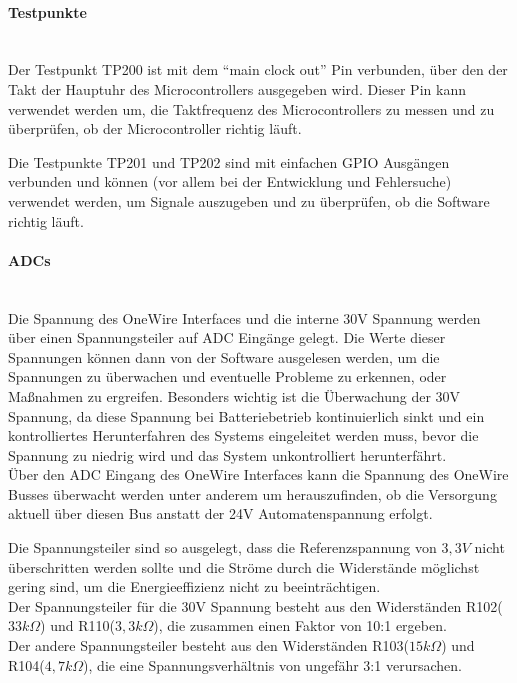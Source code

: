 \paragraph{Testpunkte}\mbox{}\\
Der Testpunkt TP200 ist mit dem \enquote{main clock out} Pin verbunden, über den der Takt der Hauptuhr des Microcontrollers
ausgegeben wird. Dieser Pin kann verwendet werden um, die Taktfrequenz des Microcontrollers zu messen und zu überprüfen, ob
der Microcontroller richtig läuft. 

Die Testpunkte TP201 und TP202 sind mit einfachen \ac{GPIO} Ausgängen verbunden und können (vor allem bei der Entwicklung und 
Fehlersuche) verwendet werden, um Signale auszugeben und zu überprüfen, ob die Software richtig läuft. 

\paragraph{\acp{ADC}}\mbox{}\\
Die Spannung des OneWire Interfaces und die interne 30V Spannung werden über einen Spannungsteiler auf \ac{ADC} Eingänge gelegt.
Die Werte dieser Spannungen können dann von der Software ausgelesen werden, um die Spannungen zu überwachen und eventuelle
Probleme zu erkennen, oder Maßnahmen zu ergreifen. Besonders wichtig ist die Überwachung der 30V Spannung, da diese 
Spannung bei Batteriebetrieb kontinuierlich sinkt und ein kontrolliertes Herunterfahren des Systems eingeleitet werden muss,
bevor die Spannung zu niedrig wird und das System unkontrolliert herunterfährt. \\
Über den \ac{ADC} Eingang des OneWire Interfaces kann die Spannung des OneWire Busses überwacht werden unter anderem um 
herauszufinden, ob die Versorgung aktuell über diesen Bus anstatt der 24V Automatenspannung erfolgt.

Die Spannungsteiler sind so ausgelegt, dass die Referenzspannung von \(3,3V\) nicht überschritten werden sollte und die 
Ströme durch die Widerstände möglichst gering sind, um die Energieeffizienz nicht zu beeinträchtigen. \\
Der Spannungsteiler für die 30V Spannung besteht aus den Widerständen R102(\(33k\Omega\)) und R110(\(3,3k\Omega\)), die 
zusammen einen Faktor von 10:1 ergeben. \\
Der andere Spannungsteiler besteht aus den Widerständen R103(\(15k\Omega\)) und R104(\(4,7k\Omega\)), die eine 
Spannungsverhältnis von ungefähr 3:1 verursachen.


